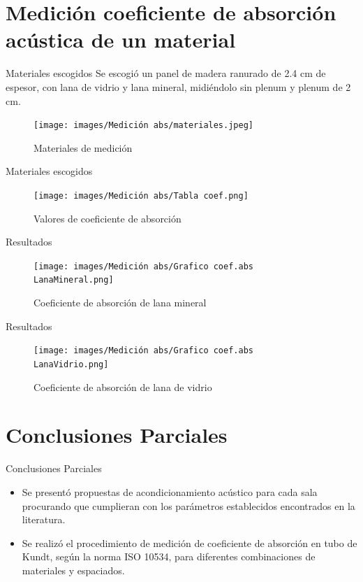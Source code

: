 \documentclass{sintefbeamer}
\begin{document}
\section{Medición coeficiente de absorción acústica de un material}
\begin{frame}{Materiales escogidos}
    Se escogió un panel de madera ranurado de 2.4 cm de espesor, con lana de vidrio y lana mineral, midiéndolo sin plenum y plenum de 2 cm.
    \begin{figure}[H]
        \centering
        \texttt{[image: images/Medición abs/materiales.jpeg]}
        \caption{Materiales de medición}
        \label{fig: materiales a medir}
    \end{figure}
\end{frame}

\begin{frame}{Materiales escogidos}
    \begin{figure}
        \centering
        \texttt{[image: images/Medición abs/Tabla coef.png]}
        \caption{Valores de coeficiente de absorción}
        \label{fig:enter-label}
    \end{figure}
\end{frame}

\begin{frame}{Resultados}
    \begin{figure}
        \centering
        \texttt{[image: images/Medición abs/Grafico coef.abs LanaMineral.png]}
        \caption{Coeficiente de absorción de lana mineral}
        \label{fig:grafico coef Lana mineral}
    \end{figure}
\end{frame}

\begin{frame}{Resultados}
    \begin{figure}
        \centering
        \texttt{[image: images/Medición abs/Grafico coef.abs LanaVidrio.png]}
        \caption{Coeficiente de absorción de lana de vidrio}
        \label{fig:grafico coef Lana vidrio}
    \end{figure}
\end{frame}

\section{Conclusiones Parciales}
\begin{frame}{Conclusiones Parciales}

\begin{itemize}
    \item Se presentó propuestas de acondicionamiento acústico para cada sala procurando que cumplieran con los parámetros establecidos encontrados en la literatura.
    \item Se realizó el procedimiento de medición de coeficiente de absorción en tubo de Kundt, según la norma ISO 10534, para diferentes combinaciones de materiales y espaciados.
\end{itemize}  
\end{frame}



\backmatter
\end{document}
